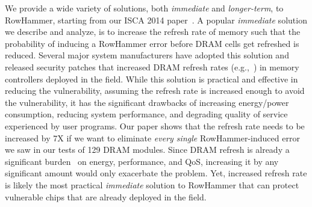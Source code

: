 \documentclass[runningheads]{llncs}
\begin{document}


We provide a wide variety of solutions, both {\em immediate} and {\em
  longer-term}, to RowHammer, starting from our ISCA 2014
paper~\cite{rowhammer-isca2014}. A popular {\em immediate} solution we
describe and analyze, is to increase the refresh rate of memory such
that the probability of inducing a RowHammer error before DRAM cells
get refreshed is reduced. Several major system manufacturers have
adopted this solution and released security patches that increased
DRAM refresh rates (e.g.,~\cite{rh-apple,rh-hp,rh-lenovo,rh-cisco}) in
memory controllers deployed in the field. While this solution is
practical and effective in reducing the vulnerability, assuming the
refresh rate is increased enough to avoid the vulnerability, it has
the significant drawbacks of increasing energy/power consumption,
reducing system performance, and degrading quality of service
experienced by user programs. Our paper shows that the refresh rate
needs to be increased by 7X if we want to eliminate {\em every single}
RowHammer-induced error we saw in our tests of 129 DRAM modules. Since
DRAM refresh is already a significant
burden~\cite{raidr,dram-isca2013,darp-hpca2014,kang-memforum2014,samira-sigmetrics14,avatar-dsn15,khan-dsn16,patel2017reach,vrl-dram}
on energy, performance, and QoS, increasing it by any significant
amount would only exacerbate the problem. Yet, increased refresh rate
is likely the most practical {\em immediate} solution to RowHammer
that can protect vulnerable chips that are already deployed in the
field.

\end{document}
